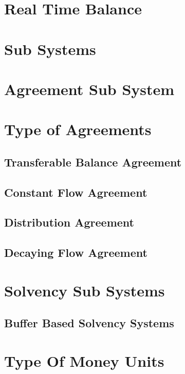 \documentclass[a4paper]{report}
\begin{document}
\section{Real Time Balance}

\section{Sub Systems}

\section{Agreement Sub System}

\section{Type of Agreements}

\subsection{Transferable Balance Agreement}

\subsection{Constant Flow Agreement}

\subsection{Distribution Agreement}

\subsection{Decaying Flow Agreement}

\section{Solvency Sub Systems}

\subsection{Buffer Based Solvency Systems}

\section{Type Of Money Units}

\end{document}
